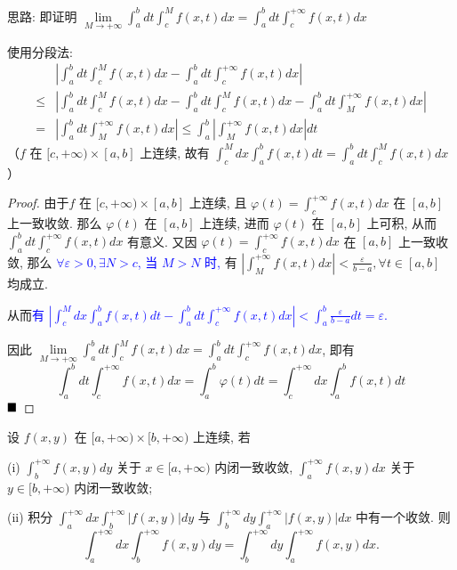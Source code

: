 \documentclass[lang=cn,newtx,10pt,scheme=chinese]{elegantbook}
\begin{document}
\begin{note}
思路: 即证明 $\lim\limits_{M \to +\infty} \int_{a}^{b} dt \int_{c}^{M} f(x, t) dx = \int_{a}^{b} dt \int_{c}^{+\infty} f(x, t) dx$

使用分段法:
\begin{align*}
& \left|\int_{a}^{b} dt \int_{c}^{M} f(x,t)dx - \int_{a}^{b} dt \int_{c}^{+\infty} f(x,t)dx\right| \\
\le & \left|\int_{a}^{b} dt \int_{c}^{M} f(x,t)dx - \int_{a}^{b} dt \int_{c}^{M} f(x,t)dx - \int_{a}^{b} dt \int_{M}^{+\infty} f(x,t)dx\right| \\
= & \left|\int_{a}^{b} dt \int_{M}^{+\infty} f(x,t)dx\right| \le \int_{a}^{b} \left|\int_{M}^{+\infty} f(x,t)dx\right| dt
\end{align*}
（$f$ 在 $[c, +\infty) \times [a, b]$ 上连续, 故有 $\int_{c}^{M} dx \int_{a}^{b} f(x, t) dt = \int_{a}^{b} dt \int_{c}^{M} f(x, t) dx$）

\end{note}

\begin{proof}
由于$f$ 在 $[c, +\infty) \times [a, b]$ 上连续, 且 $\varphi(t) = \int_{c}^{+\infty} f(x, t) dx$ 在 $[a, b]$ 上一致收敛. 那么 $\varphi(t)$ 在 $[a, b]$ 上连续, 进而 $\varphi(t)$ 在 $[a, b]$ 上可积, 从而 $\int_{a}^{b} dt \int_{c}^{+\infty} f(x, t) dx$ 有意义. 又因 $\varphi(t) = \int_{c}^{+\infty} f(x, t) dx$ 在 $[a, b]$ 上一致收敛, 那么 \textcolor{blue}{$\forall \varepsilon > 0, \exists N > c$, 当 $M > N$ 时,} 有 $|\int_{M}^{+\infty} f(x, t) dx| < \frac{\varepsilon}{b-a}, \forall t \in [a, b]$ 均成立.

从而\textcolor{blue}{有 $|\int_{c}^{M} dx \int_{a}^{b} f(x, t) dt - \int_{a}^{b} dt \int_{c}^{+\infty} f(x, t) dx| < \int_{a}^{b} \frac{\varepsilon}{b-a} dt = \varepsilon$.}

因此 $\lim\limits_{M \to +\infty} \int_{a}^{b} dt \int_{c}^{M} f(x, t) dx = \int_{a}^{b} dt \int_{c}^{+\infty} f(x, t) dx$, 即有
$$ \int_{a}^{b} dt \int_{c}^{+\infty} f(x, t) dx = \int_{a}^{b} \varphi(t) dt = \int_{c}^{+\infty} dx \int_{a}^{b} f(x, t) dt $$
$\hfill \blacksquare$
\end{proof}

\begin{theorem}
设 $f(x, y)$ 在 $[a, +\infty) \times [b, +\infty)$ 上连续, 若

(i) $\int_{b}^{+\infty} f(x, y) dy$ 关于 $x \in [a, +\infty)$ 内闭一致收敛, $\int_{a}^{+\infty} f(x, y) dx$ 关于 $y \in [b, +\infty)$ 内闭一致收敛;

(ii) 积分 $\int_{a}^{+\infty} dx \int_{b}^{+\infty} |f(x, y)| dy$ 与 $\int_{b}^{+\infty} dy \int_{a}^{+\infty} |f(x, y)| dx$ 中有一个收敛.
则
$$ \int_{a}^{+\infty} dx \int_{b}^{+\infty} f(x, y) dy = \int_{b}^{+\infty} dy \int_{a}^{+\infty} f(x, y) dx. $$
\end{theorem}
\end{document}
